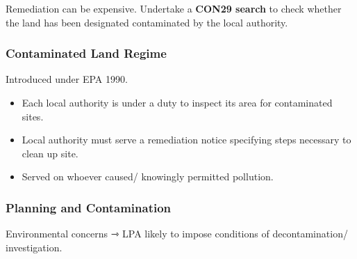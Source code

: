 \documentclass[
]{article}
\providecommand{\tightlist}{%
  \setlength{\itemsep}{0pt}\setlength{\parskip}{0pt}}
\begin{document}
Remediation can be expensive. Undertake a \textbf{CON29 search} to check
whether the land has been designated contaminated by the local
authority.

\hypertarget{contaminated-land-regime}{%
\subsubsection{Contaminated Land
Regime}\label{contaminated-land-regime}}

Introduced under EPA 1990.

\begin{itemize}
\tightlist
\item
  Each local authority is under a duty to inspect its area for
  contaminated sites.
\item
  Local authority must serve a remediation notice specifying steps
  necessary to clean up site.
\item
  Served on whoever caused/ knowingly permitted pollution.
\end{itemize}

\hypertarget{planning-and-contamination}{%
\subsubsection{Planning and
Contamination}\label{planning-and-contamination}}

Environmental concerns ⇾ LPA likely to impose conditions of
decontamination/ investigation.
\end{document}
